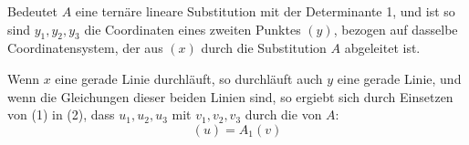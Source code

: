 Bedeutet $A$ eine ternäre lineare Substitution mit der Determinante 1, und ist
so sind $y_1, y_2, y_3$ die Coordinaten eines zweiten Punktes $(y)$, bezogen auf dasselbe Coordinatensystem, der aus $(x)$ durch die Substitution $A$ abgeleitet ist.

Wenn $x$ eine gerade Linie durchläuft, so durchläuft auch $y$ eine gerade Linie, und wenn die Gleichungen dieser beiden Linien
sind, so ergiebt sich durch Einsetzen von (1) in (2), dass $u_1, u_2, u_3$ mit $v_1, v_2, v_3$ durch die  von $A$:
\[ (u) = A_1(v) \]
